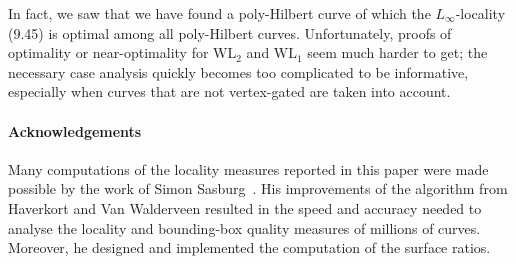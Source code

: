 \documentclass[11pt,a4paper]{article}
\def\WLEuc{\ensuremath{\mathrm{WL}_2}\xspace}
\def\WLMan{\ensuremath{\mathrm{WL}_1}\xspace}
\begin{document}
In fact, we saw that we have found a poly-Hilbert curve of which the $L_\infty$-locality (9.45) is optimal among all poly-Hilbert curves. Unfortunately, proofs of optimality or near-optimality for $\WLEuc$ and $\WLMan$ seem much harder to get; the necessary case analysis quickly becomes too complicated to be informative, especially when curves that are not vertex-gated are taken into account.



\paragraph*{Acknowledgements}
Many computations of the locality measures reported in this paper were made possible by the work of Simon Sasburg~\cite{Sasburg}. His improvements of the algorithm from Haverkort and Van Walderveen resulted in the speed and accuracy needed to analyse the locality and bounding-box quality measures of millions of curves. Moreover, he designed and implemented the computation of the surface ratios.


\end{document}
